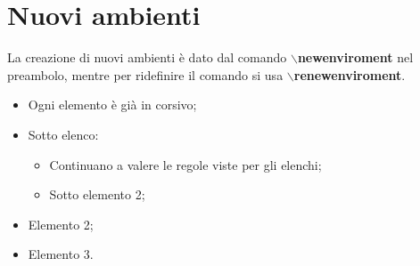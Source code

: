 \documentclass[a4paper,12pt,oneside]{book}
\theoremstyle{plain}
\newenvironment{corsivo}{\begin{itemize}\itshape}{\end{itemize}}
\begin{document}
	\section{Nuovi ambienti}
	La creazione di nuovi ambienti è dato dal comando \textbf{$\backslash$newenviroment} nel preambolo, mentre per ridefinire il comando si usa \textbf{$\backslash$renewenviroment}.
	\begin{corsivo}
		\item Ogni elemento è già in corsivo;
		
		\item Sotto elenco:
		\begin{corsivo}
			\item Continuano a valere le regole viste per gli elenchi;
			
			\item Sotto elemento 2;
		\end{corsivo}
		
		\item Elemento 2;
		
		\item Elemento 3.
	\end{corsivo}
	
	
	
	\printindex
\end{document}
